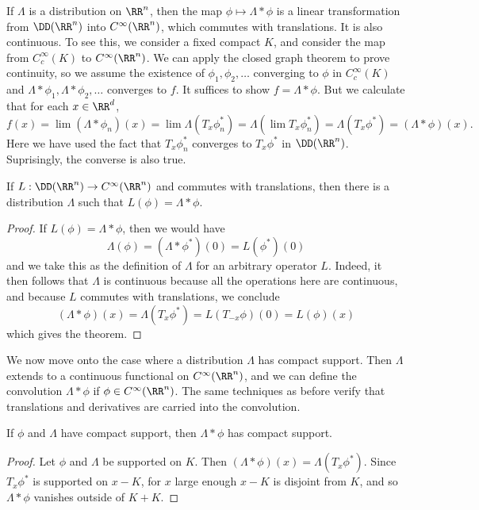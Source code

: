 If $\Lambda$ is a distribution on $\RR^n$, then the map $\phi \mapsto \Lambda * \phi$ is a linear transformation from $\DD(\RR^n)$ into $C^\infty(\RR^n)$, which commutes with translations. It is also continuous. To see this, we consider a fixed compact $K$, and consider the map from $C_c^\infty(K)$ to $C^\infty(\RR^n)$. We can apply the closed graph theorem to prove continuity, so we assume the existence of $\phi_1, \phi_2, \dots$ converging to $\phi$ in $C_c^\infty(K)$ and $\Lambda * \phi_1, \Lambda * \phi_2, \dots$ converges to $f$. It suffices to show $f = \Lambda * \phi$. But we calculate that for each $x \in \RR^d$,
%
\[ f(x) = \lim (\Lambda * \phi_n)(x) = \lim \Lambda(T_x \phi^*_n) = \Lambda (\lim T_x \phi^*_n) = \Lambda(T_x \phi^*) = (\Lambda * \phi)(x). \]
%
Here we have used the fact that $T_x \phi_n^*$ converges to $T_x \phi^*$ in $\DD(\RR^n)$. Suprisingly, the converse is also true.

\begin{theorem}
    If $L: \DD(\RR^n) \to C^\infty(\RR^n)$ and commutes with translations, then there is a distribution $\Lambda$ such that $L(\phi) = \Lambda * \phi$.
\end{theorem}
\begin{proof}
    If $L(\phi) = \Lambda * \phi$, then we would have
    \[ \Lambda(\phi) = (\Lambda * \phi^*)(0) = L(\phi^*)(0) \]
    and we take this as the definition of $\Lambda$ for an arbitrary operator $L$. Indeed, it then follows that $\Lambda$ is continuous because all the operations here are continuous, and because $L$ commutes with translations, we conclude
    \[ (\Lambda * \phi)(x) = \Lambda(T_x \phi^*) = L(T_{-x} \phi)(0) = L(\phi)(x) \]
    which gives the theorem.
\end{proof}

We now move onto the case where a distribution $\Lambda$ has compact support. Then $\Lambda$ extends to a continuous functional on $C^\infty(\RR^n)$, and we can define the convolution $\Lambda * \phi$ if $\phi \in C^\infty(\RR^n)$. The same techniques as before verify that translations and derivatives are carried into the convolution.

\begin{theorem}
    If $\phi$ and $\Lambda$ have compact support, then $\Lambda * \phi$ has compact support.
\end{theorem}
\begin{proof}
    Let $\phi$ and $\Lambda$ be supported on $K$. Then $(\Lambda * \phi)(x) = \Lambda(T_x \phi^*)$. Since $T_x \phi^*$ is supported on $x - K$, for $x$ large enough $x-K$ is disjoint from $K$, and so $\Lambda * \phi$ vanishes outside of $K + K$.
\end{proof}

